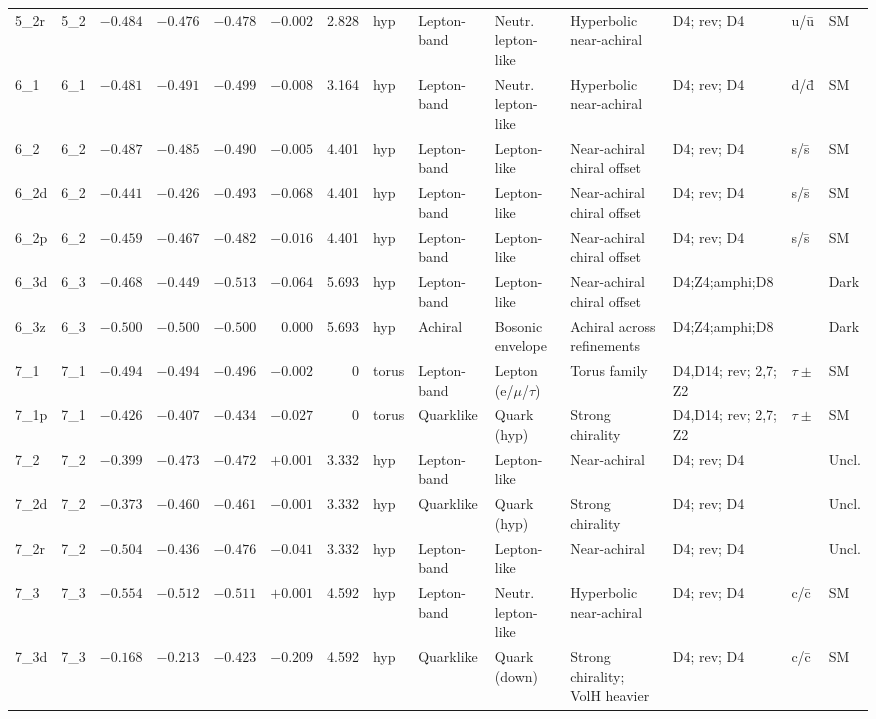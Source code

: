 \begin{landscape}
\begin{longtable}{@{}llrrrrrllp{3.2cm}lp{2.8cm}@{}}
5\_2r & 5\_2 & $-0.484$ & $-0.476$ & $-0.478$ & $-0.002$ & 2.828 & hyp & Lepton-band & Neutr. lepton-like & Hyperbolic near-achiral & D4; rev; D4 & u/ū & SM \\
6\_1 & 6\_1 & $-0.481$ & $-0.491$ & $-0.499$ & $-0.008$ & 3.164 & hyp & Lepton-band & Neutr. lepton-like & Hyperbolic near-achiral & D4; rev; D4 & d/d̄ & SM \\
6\_2 & 6\_2 & $-0.487$ & $-0.485$ & $-0.490$ & $-0.005$ & 4.401 & hyp & Lepton-band & Lepton-like & Near-achiral chiral offset & D4; rev; D4 & s/s̄ & SM \\
6\_2d & 6\_2 & $-0.441$ & $-0.426$ & $-0.493$ & $-0.068$ & 4.401 & hyp & Lepton-band & Lepton-like & Near-achiral chiral offset & D4; rev; D4 & s/s̄ & SM \\
6\_2p & 6\_2 & $-0.459$ & $-0.467$ & $-0.482$ & $-0.016$ & 4.401 & hyp & Lepton-band & Lepton-like & Near-achiral chiral offset & D4; rev; D4 & s/s̄ & SM \\
6\_3d & 6\_3 & $-0.468$ & $-0.449$ & $-0.513$ & $-0.064$ & 5.693 & hyp & Lepton-band & Lepton-like & Near-achiral chiral offset & D4;Z4;amphi;D8 & & Dark \\
6\_3z & 6\_3 & $-0.500$ & $-0.500$ & $-0.500$ & 0.000 & 5.693 & hyp & Achiral & Bosonic envelope & Achiral across refinements & D4;Z4;amphi;D8 & & Dark \\
7\_1 & 7\_1 & $-0.494$ & $-0.494$ & $-0.496$ & $-0.002$ & 0 & torus & Lepton-band & Lepton (e/$\mu$/$\tau$) & Torus family & D4,D14; rev; 2,7; Z2 & $\tau\pm$ & SM \\
7\_1p & 7\_1 & $-0.426$ & $-0.407$ & $-0.434$ & $-0.027$ & 0 & torus & Quarklike & Quark (hyp) & Strong chirality & D4,D14; rev; 2,7; Z2 & $\tau\pm$ & SM \\
7\_2 & 7\_2 & $-0.399$ & $-0.473$ & $-0.472$ & $+0.001$ & 3.332 & hyp & Lepton-band & Lepton-like & Near-achiral & D4; rev; D4 & & Uncl. \\
7\_2d & 7\_2 & $-0.373$ & $-0.460$ & $-0.461$ & $-0.001$ & 3.332 & hyp & Quarklike & Quark (hyp) & Strong chirality & D4; rev; D4 & & Uncl. \\
7\_2r & 7\_2 & $-0.504$ & $-0.436$ & $-0.476$ & $-0.041$ & 3.332 & hyp & Lepton-band & Lepton-like & Near-achiral & D4; rev; D4 & & Uncl. \\
7\_3 & 7\_3 & $-0.554$ & $-0.512$ & $-0.511$ & $+0.001$ & 4.592 & hyp & Lepton-band & Neutr. lepton-like & Hyperbolic near-achiral & D4; rev; D4 & c/c̄ & SM \\
7\_3d & 7\_3 & $-0.168$ & $-0.213$ & $-0.423$ & $-0.209$ & 4.592 & hyp & Quarklike & Quark (down) & Strong chirality; VolH heavier & D4; rev; D4 & c/c̄ & SM \\

\end{longtable}
\end{landscape}
